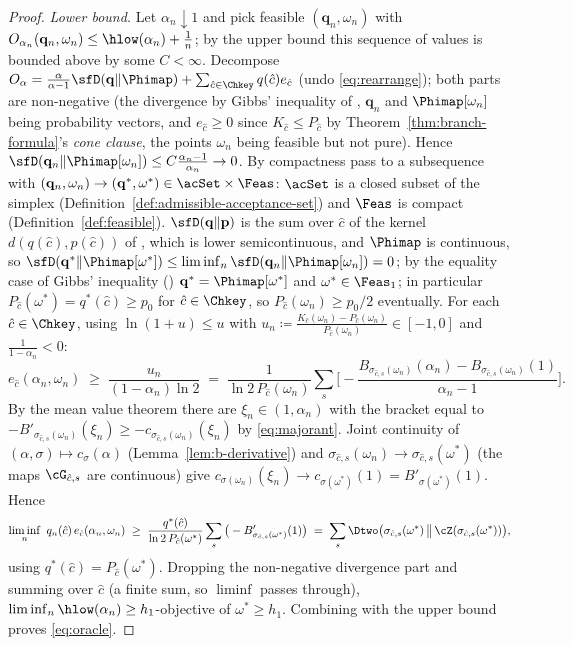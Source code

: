 \begin{proof}
\emph{Lower bound.} Let $\alpha_n\downarrow1$ and pick feasible
$(\mathbf q_n,\omega_n)$ with
$O_{\alpha_n}(\mathbf q_n,\omega_n)\le\hlow(\alpha_n)+\frac1n$; by the
upper bound this sequence of values is bounded above by some $C<\infty$.
Decompose $O_{\alpha}=\frac{\alpha}{\alpha-1}\sfD(\mathbf q\|\Phimap)
+\sum_{\hat c\in\Chkey}q(\hat c)e_{\hat c}$ (undo
\eqref{eq:rearrange}); both parts are non-negative (the divergence by
Gibbs' inequality of , $\mathbf q_n$ and
$\Phimap[\omega_n]$ being probability vectors, and $e_{\hat c}\ge0$ since $K_{\hat c}\le P_{\hat c}$ by
Theorem~\ref{thm:branch-formula}'s \emph{cone clause}, the points $\omega_n$ being
feasible but not pure). Hence
$\sfD(\mathbf q_n\|\Phimap[\omega_n])\le C\frac{\alpha_n-1}{\alpha_n}
\to0$. By compactness pass to a subsequence with
$(\mathbf q_n,\omega_n)\to(\mathbf q^{*},\omega^{*})
\in\acSet\times\Feas$: $\acSet$ is a closed subset of the simplex
(Definition~\ref{def:admissible-acceptance-set}) and $\Feas$ is compact
(Definition~\ref{def:feasible}). $\sfD(\mathbf q\|\mathbf p)$ is the sum
over $\hat c$ of the kernel $d(q(\hat c),p(\hat c))$ of
, which is lower semicontinuous, and
$\Phimap$ is continuous, so
$\sfD(\mathbf q^{*}\|\Phimap[\omega^{*}])\le
\liminf_n\sfD(\mathbf q_n\|\Phimap[\omega_n])=0$; by the equality case of
Gibbs' inequality ()
$\mathbf q^{*}=\Phimap[\omega^{*}]$ and
$\omega^{*}\in\Feas_1$; in particular
$P_{\hat c}(\omega^{*})=q^{*}(\hat c)\ge p_0$ for $\hat c\in\Chkey$, so
$P_{\hat c}(\omega_n)\ge p_0/2$ eventually. For each
$\hat c\in\Chkey$, using $\ln(1+u)\le u$ with
$u_n\coloneqq\frac{K_{\hat c}(\omega_n)-P_{\hat c}(\omega_n)}
{P_{\hat c}(\omega_n)}\in[-1,0]$ and $\frac{1}{1-\alpha_n}<0$:
\begin{equation*}
  e_{\hat c}(\alpha_n,\omega_n)
  \;\ge\;\frac{u_n}{(1-\alpha_n)\ln2}
  \;=\;\frac{1}{\ln2\,P_{\hat c}(\omega_n)}
  \sum_{s}\Big[-\frac{B_{\sigma_{\hat c,s}(\omega_n)}(\alpha_n)
  -B_{\sigma_{\hat c,s}(\omega_n)}(1)}{\alpha_n-1}\Big].
\end{equation*}
By the mean value theorem there are $\xi_n\in(1,\alpha_n)$ with the
bracket equal to $-B'_{\sigma_{\hat c,s}(\omega_n)}(\xi_n)
\ge-c_{\sigma_{\hat c,s}(\omega_n)}(\xi_n)$ by \eqref{eq:majorant}. Joint
continuity of $(\alpha,\sigma)\mapsto c_{\sigma}(\alpha)$
(Lemma~\ref{lem:b-derivative}) and
$\sigma_{\hat c,s}(\omega_n)\to\sigma_{\hat c,s}(\omega^{*})$ (the maps
$\cG_{\hat c,s}$ are continuous) give
$c_{\sigma(\omega_n)}(\xi_n)\to
c_{\sigma(\omega^{*})}(1)=B'_{\sigma(\omega^{*})}(1)$. Hence
\begin{equation*}
  \liminf_n\ q_n(\hat c)\,e_{\hat c}(\alpha_n,\omega_n)
  \;\ge\;\frac{q^{*}(\hat c)}{\ln2\,P_{\hat c}(\omega^{*})}
  \sum_{s}\big(-B'_{\sigma_{\hat c,s}(\omega^{*})}(1)\big)
  \;=\;\sum_{s}\Dtwo\big(\sigma_{\hat c,s}(\omega^{*})\,\big\|\,
  \cZ(\sigma_{\hat c,s}(\omega^{*}))\big),
\end{equation*}
using $q^{*}(\hat c)=P_{\hat c}(\omega^{*})$. Dropping the non-negative
divergence part and summing over $\hat c$ (a finite sum, so
$\liminf$ passes through),
$\liminf_n\hlow(\alpha_n)\ge h_1$-objective of
$\omega^{*}\ge h_1$. Combining with the upper bound proves
\eqref{eq:oracle}.
\end{proof}

